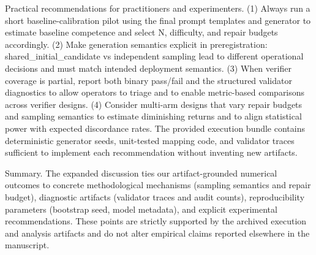 \documentclass[conference]{IEEEtran}
\begin{document}
Practical recommendations for practitioners and experimenters. (1) Always run a short baseline-calibration pilot using the final prompt templates and generator to estimate baseline competence and select N, difficulty, and repair budgets accordingly. (2) Make generation semantics explicit in preregistration: shared\_initial\_candidate vs independent sampling lead to different operational decisions and must match intended deployment semantics. (3) When verifier coverage is partial, report both binary pass/fail and the structured validator diagnostics to allow operators to triage and to enable metric-based comparisons across verifier designs. (4) Consider multi-arm designs that vary repair budgets and sampling semantics to estimate diminishing returns and to align statistical power with expected discordance rates. The provided execution bundle contains deterministic generator seeds, unit-tested mapping code, and validator traces sufficient to implement each recommendation without inventing new artifacts.

Summary. The expanded discussion ties our artifact-grounded numerical outcomes to concrete methodological mechanisms (sampling semantics and repair budget), diagnostic artifacts (validator traces and audit counts), reproducibility parameters (bootstrap seed, model metadata), and explicit experimental recommendations. These points are strictly supported by the archived execution and analysis artifacts and do not alter empirical claims reported elsewhere in the manuscript.
\end{document}
